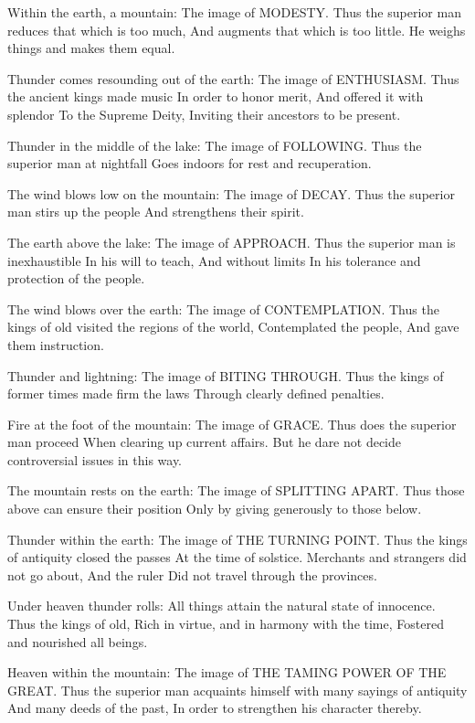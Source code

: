{Within the earth, a mountain:
 The image of MODESTY.
 Thus the superior man reduces that which is too much,
 And augments that which is too little.
 He weighs things and makes them equal.}

{Thunder comes resounding out of the earth:
 The image of ENTHUSIASM.
 Thus the ancient kings made music
 In order to honor merit,
 And offered it with splendor
 To the Supreme Deity,
 Inviting their ancestors to be present.}

{Thunder in the middle of the lake:
 The image of FOLLOWING.
 Thus the superior man at nightfall
 Goes indoors for rest and recuperation.}

{The wind blows low on the mountain:
 The image of DECAY.
 Thus the superior man stirs up the people
 And strengthens their spirit.}

{The earth above the lake:
 The image of APPROACH.
 Thus the superior man is inexhaustible
 In his will to teach,
 And without limits
 In his tolerance and protection of the people.}

{The wind blows over the earth:
 The image of CONTEMPLATION.
 Thus the kings of old visited the regions of the world,
 Contemplated the people,
 And gave them instruction.}

{Thunder and lightning:
 The image of BITING THROUGH.
 Thus the kings of former times made firm the laws
 Through clearly defined penalties.}

{Fire at the foot of the mountain:
 The image of GRACE.
 Thus does the superior man proceed
 When clearing up current affairs.
 But he dare not decide controversial issues in this way.}

{The mountain rests on the earth:
 The image of SPLITTING APART.
 Thus those above can ensure their position
 Only by giving generously to those below.}

{Thunder within the earth:
 The image of THE TURNING POINT.
 Thus the kings of antiquity closed the passes
 At the time of solstice.
 Merchants and strangers did not go about,
 And the ruler
 Did not travel through the provinces.}

{Under heaven thunder rolls:
 All things attain the natural state of innocence.
 Thus the kings of old,
 Rich in virtue, and in harmony with the time,
 Fostered and nourished all beings.}

{Heaven within the mountain:
 The image of THE TAMING POWER OF
 THE GREAT.
 Thus the superior man acquaints himself with many sayings of antiquity
 And many deeds of the past,
 In order to strengthen his character thereby.}

